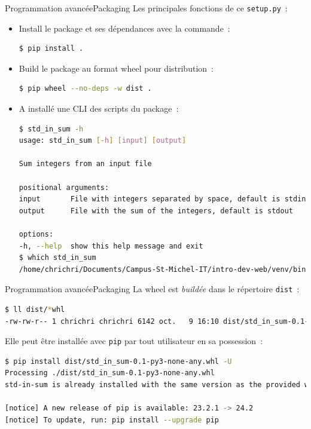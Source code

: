 \documentclass{beamer}
\begin{document}
    \begin{frame}[fragile]{Programmation avancée}{Packaging}
        Les principales fonctions de ce \lstinline{setup.py}~:
        \begin{itemize}
            \item Install le package et ses dépendances avec la commande~:
            \begin{lstlisting}[language=bash,basicstyle=\tiny\ttfamily]
$ pip install .
            \end{lstlisting}
            \item Build le package au format wheel pour distribution~:
            \begin{lstlisting}[language=bash,basicstyle=\tiny\ttfamily]
$ pip wheel --no-deps -w dist .
            \end{lstlisting}
            \item A installé une CLI des scripts du package~:
            \begin{lstlisting}[language=Bash,basicstyle=\tiny\ttfamily]
$ std_in_sum -h
usage: std_in_sum [-h] [input] [output]

Sum integers from an input file

positional arguments:
input       File with integers separated by space, default is stdin
output      File with the sum of the integers, default is stdout

options:
-h, --help  show this help message and exit
$ which std_in_sum
/home/chrichri/Documents/Campus-St-Michel-IT/intro-dev-web/venv/bin/std_in_sum
            \end{lstlisting}
        \end{itemize}
    \end{frame}

    \begin{frame}[fragile]{Programmation avancée}{Packaging}
        La wheel est \textit{buildée} dans le répertoire \lstinline{dist}~:
        \begin{lstlisting}[language=bash]
$ ll dist/*whl
-rw-rw-r-- 1 chrichri chrichri 6142 oct.   9 16:10 dist/std_in_sum-0.1-py3-none-any.whl
        \end{lstlisting}
        \bigbreak
        Elle peut être installée avec \lstinline{pip} par tout utilisateur en sa possession~:
        \begin{lstlisting}[language=bash]
$ pip install dist/std_in_sum-0.1-py3-none-any.whl -U
Processing ./dist/std_in_sum-0.1-py3-none-any.whl
std-in-sum is already installed with the same version as the provided wheel. Use --force-reinstall to force an installation of the wheel.

[notice] A new release of pip is available: 23.2.1 -> 24.2
[notice] To update, run: pip install --upgrade pip
        \end{lstlisting}
    \end{frame}
\end{document}

